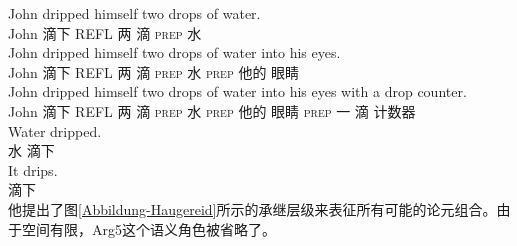 \begin{exe}
\begin{xlist}[iv.]
\begin{exe}
\begin{xlist}[iv.]
\ex
\gll John dripped himself two drops of water.     \\
     John 滴下 REFL 两 滴 \textsc{prep} 水\\
\ex
\gll John dripped himself two drops of water into his eyes. \\
     John 滴下 REFL 两 滴 \textsc{prep} 水 \textsc{prep} 他的 眼睛\\
\ex
\gll John dripped himself two drops of water into his eyes with a drop counter. \\
     John 滴下 REFL 两 滴 \textsc{prep} 水 \textsc{prep} 他的 眼睛 \textsc{prep} 一 滴 计数器\\
\ex
\gll Water dripped. \\
     水 滴下\\
\ex
\gll It drips. \\
     \expl{} 滴下\\
\zl
他提出了图\ref{Abbildung-Haugereid}所示的承继层级来表征所有可能的论元组合。由于空间有限，Arg5这个语义角色被省略了。


\end{xlist}
\end{exe}
\end{xlist}
\end{exe}
